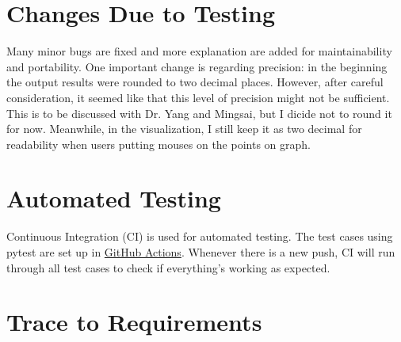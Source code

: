 \documentclass[12pt, titlepage]{article}
\begin{document}
\section{Changes Due to Testing}
Many minor bugs are fixed and more explanation are added for maintainability and portability. One important change is regarding precision: in the beginning the output results were rounded to two decimal places. However, after careful consideration, it seemed like that this level of precision might not be sufficient. This is to be discussed with Dr. Yang and Mingsai, but I dicide not to round it for now. Meanwhile, in the visualization, I still keep it as two decimal for readability when users putting mouses on the points on graph.  

\section{Automated Testing}
Continuous Integration (CI) is used for automated testing. The test cases using pytest are set up in \href{https://github.com/CynthiaLiu0805/BridgeCorrosion/actions}{GitHub Actions}. Whenever there is a new push, CI will run through all test cases to check if everything's working as expected.

\section{Trace to Requirements}
\end{document}
